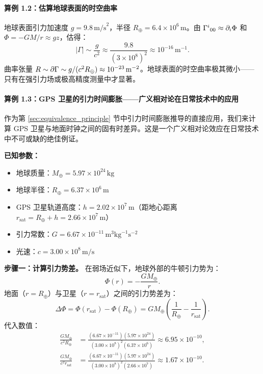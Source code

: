 \paragraph{算例 1.2：估算地球表面的时空曲率}

地球表面引力加速度 $g = 9.8\,\text{m/s}^2$，半径 $R_\oplus = 6.4 \times 10^6\,\text{m}$。由 $\Gamma^i{}_{00} \approx \partial_i \Phi$ 和 $\Phi = -GM/r \approx gz$，估得：
\begin{equation}
    |\Gamma| \sim \frac{g}{c^2} \approx \frac{9.8}{(3\times10^8)^2} \approx 10^{-16}\,\text{m}^{-1}.
\end{equation}
曲率张量 $R \sim \partial\Gamma \sim g/(c^2 R_\oplus) \approx 10^{-23}\,\text{m}^{-2}$。地球表面的时空曲率极其微小——只有在强引力场或极高精度测量中才显著。

\paragraph{算例 1.3：GPS 卫星的引力时间膨胀——广义相对论在日常技术中的应用}
\label{para:gps}

作为第 \ref{sec:equivalence_principle} 节中引力时间膨胀推导的直接应用，我们来计算 GPS 卫星与地面时钟之间的固有时差异。这是一个广义相对论效应在日常技术中不可或缺的绝佳例证。

\medskip

\noindent\textbf{已知参数：}
\begin{itemize}
    \item 地球质量：$M_\oplus = 5.97 \times 10^{24}\,\text{kg}$
    \item 地球半径：$R_\oplus = 6.37 \times 10^6\,\text{m}$
    \item GPS 卫星轨道高度：$h = 2.02 \times 10^7\,\text{m}$（距地心距离 $r_{\text{sat}} = R_\oplus + h = 2.66 \times 10^7\,\text{m}$）
    \item 引力常数：$G = 6.67 \times 10^{-11}\,\text{m}^3\text{kg}^{-1}\text{s}^{-2}$
    \item 光速：$c = 3.00 \times 10^8\,\text{m/s}$
\end{itemize}

\medskip

\noindent\textbf{步骤一：计算引力势差。} 在弱场近似下，地球外部的牛顿引力势为：
\begin{equation}
    \Phi(r) = -\frac{GM_\oplus}{r}.
\end{equation}
地面（$r = R_\oplus$）与卫星（$r = r_{\text{sat}}$）之间的引力势差为：
\begin{equation}
    \Delta \Phi = \Phi(r_{\text{sat}}) - \Phi(R_\oplus) = GM_\oplus\left(\frac{1}{R_\oplus} - \frac{1}{r_{\text{sat}}}\right).
\end{equation}
代入数值：
\begin{align}
    \frac{GM_\oplus}{c^2 R_\oplus} &= \frac{(6.67\times10^{-11})(5.97\times10^{24})}{(3.00\times10^8)^2(6.37\times10^6)} \approx 6.95 \times 10^{-10}, \\
    \frac{GM_\oplus}{c^2 r_{\text{sat}}} &= \frac{(6.67\times10^{-11})(5.97\times10^{24})}{(3.00\times10^8)^2(2.66\times10^7)} \approx 1.67 \times 10^{-10}.
\end{align}

